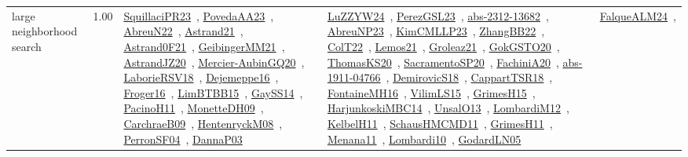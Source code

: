 {\begin{longtable}{p{3cm}r>{\raggedright\arraybackslash}p{6cm}>{\raggedright\arraybackslash}p{6cm}>{\raggedright\arraybackslash}p{8cm}}
\index{large neighborhood search}\index{Algorithms!large neighborhood search}large neighborhood search &  1.00 & \href{../works/SquillaciPR23.pdf}{SquillaciPR23}~\cite{SquillaciPR23}, \href{../works/PovedaAA23.pdf}{PovedaAA23}~\cite{PovedaAA23}, \href{../works/AbreuN22.pdf}{AbreuN22}~\cite{AbreuN22}, \href{../works/Astrand21.pdf}{Astrand21}~\cite{Astrand21}, \href{../works/Astrand0F21.pdf}{Astrand0F21}~\cite{Astrand0F21}, \href{../works/GeibingerMM21.pdf}{GeibingerMM21}~\cite{GeibingerMM21}, \href{../works/AstrandJZ20.pdf}{AstrandJZ20}~\cite{AstrandJZ20}, \href{../works/Mercier-AubinGQ20.pdf}{Mercier-AubinGQ20}~\cite{Mercier-AubinGQ20}, \href{../works/LaborieRSV18.pdf}{LaborieRSV18}~\cite{LaborieRSV18}, \href{../works/Dejemeppe16.pdf}{Dejemeppe16}~\cite{Dejemeppe16}, \href{../works/Froger16.pdf}{Froger16}~\cite{Froger16}, \href{../works/LimBTBB15.pdf}{LimBTBB15}~\cite{LimBTBB15}, \href{../works/GaySS14.pdf}{GaySS14}~\cite{GaySS14}, \href{../works/PacinoH11.pdf}{PacinoH11}~\cite{PacinoH11}, \href{../works/MonetteDH09.pdf}{MonetteDH09}~\cite{MonetteDH09}, \href{../works/CarchraeB09.pdf}{CarchraeB09}~\cite{CarchraeB09}, \href{../works/HentenryckM08.pdf}{HentenryckM08}~\cite{HentenryckM08}, \href{../works/PerronSF04.pdf}{PerronSF04}~\cite{PerronSF04}, \href{../works/DannaP03.pdf}{DannaP03}~\cite{DannaP03} & \href{../works/LuZZYW24.pdf}{LuZZYW24}~\cite{LuZZYW24}, \href{../works/PerezGSL23.pdf}{PerezGSL23}~\cite{PerezGSL23}, \href{../works/abs-2312-13682.pdf}{abs-2312-13682}~\cite{abs-2312-13682}, \href{../works/AbreuNP23.pdf}{AbreuNP23}~\cite{AbreuNP23}, \href{../works/KimCMLLP23.pdf}{KimCMLLP23}~\cite{KimCMLLP23}, \href{../works/ZhangBB22.pdf}{ZhangBB22}~\cite{ZhangBB22}, \href{../works/ColT22.pdf}{ColT22}~\cite{ColT22}, \href{../works/Lemos21.pdf}{Lemos21}~\cite{Lemos21}, \href{../works/Groleaz21.pdf}{Groleaz21}~\cite{Groleaz21}, \href{../works/GokGSTO20.pdf}{GokGSTO20}~\cite{GokGSTO20}, \href{../works/ThomasKS20.pdf}{ThomasKS20}~\cite{ThomasKS20}, \href{../works/SacramentoSP20.pdf}{SacramentoSP20}~\cite{SacramentoSP20}, \href{../works/FachiniA20.pdf}{FachiniA20}~\cite{FachiniA20}, \href{../works/abs-1911-04766.pdf}{abs-1911-04766}~\cite{abs-1911-04766}, \href{../works/DemirovicS18.pdf}{DemirovicS18}~\cite{DemirovicS18}, \href{../works/CappartTSR18.pdf}{CappartTSR18}~\cite{CappartTSR18}, \href{../works/FontaineMH16.pdf}{FontaineMH16}~\cite{FontaineMH16}, \href{../works/VilimLS15.pdf}{VilimLS15}~\cite{VilimLS15}, \href{../works/GrimesH15.pdf}{GrimesH15}~\cite{GrimesH15}, \href{../works/HarjunkoskiMBC14.pdf}{HarjunkoskiMBC14}~\cite{HarjunkoskiMBC14}, \href{../works/UnsalO13.pdf}{UnsalO13}~\cite{UnsalO13}, \href{../works/LombardiM12.pdf}{LombardiM12}~\cite{LombardiM12}, \href{../works/KelbelH11.pdf}{KelbelH11}~\cite{KelbelH11}, \href{../works/SchausHMCMD11.pdf}{SchausHMCMD11}~\cite{SchausHMCMD11}, \href{../works/GrimesH11.pdf}{GrimesH11}~\cite{GrimesH11}, \href{../works/Menana11.pdf}{Menana11}~\cite{Menana11}, \href{../works/Lombardi10.pdf}{Lombardi10}~\cite{Lombardi10}, \href{../works/GodardLN05.pdf}{GodardLN05}~\cite{GodardLN05} & \href{../works/FalqueALM24.pdf}{FalqueALM24}~\cite{FalqueALM24}, 
\end{longtable}}
